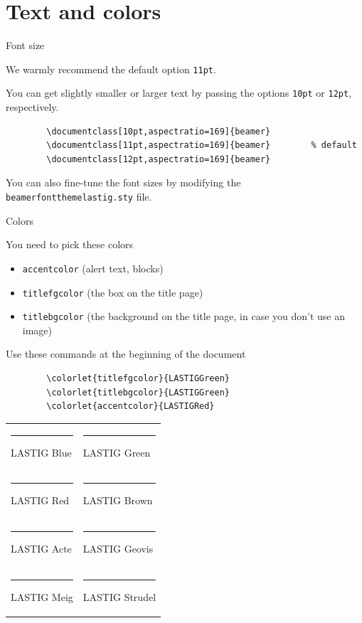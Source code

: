 \documentclass[11pt,aspectratio=169]{beamer}
\begin{document}
\section{Text and colors}
\begin{frame}[fragile]{Font size}

	We warmly recommend the default option \verb+11pt+.
	
	\bigskip
	
	You can get slightly smaller or larger text by passing the options \verb+10pt+ or \verb+12pt+, respectively.
	\begin{verbatim}
		\documentclass[10pt,aspectratio=169]{beamer}
		\documentclass[11pt,aspectratio=169]{beamer}		% default
		\documentclass[12pt,aspectratio=169]{beamer}
	\end{verbatim}	
	
	\bigskip
	You can also fine-tune the font sizes by modifying the \verb+beamerfontthemelastig.sty+ file.

\end{frame}
\begin{frame}[fragile]{Colors}

	You need to pick these colors
	\begin{itemize}
		\item \texttt{accentcolor} (alert text, blocks)
		\item \texttt{titlefgcolor} (the box on the title page)
		\item \texttt{titlebgcolor} (the background on the title page, in case you don't use an image)
	\end{itemize}
	Use these commands at the beginning of the document
	\begin{verbatim}
		\colorlet{titlefgcolor}{LASTIGGreen}
		\colorlet{titlebgcolor}{LASTIGGreen}
		\colorlet{accentcolor}{LASTIGRed}
	\end{verbatim}

	\medskip

	\begin{tabular}{ll}
	\textcolor{LASTIGBlue}{\rule{4mm}{3mm}} LASTIG Blue &
	\textcolor{LASTIGGreen}{\rule{4mm}{3mm}} LASTIG Green \\
    	\textcolor{LASTIGRed}{\rule{4mm}{3mm}} LASTIG Red &
        	\textcolor{LASTIGBrown}{\rule{4mm}{3mm}} LASTIG Brown \\
	\textcolor{LASTIGActe}{\rule{4mm}{3mm}} LASTIG Acte &
	\textcolor{LASTIGGeovis}{\rule{4mm}{3mm}} LASTIG Geovis \\
	\textcolor{LASTIGMeig}{\rule{4mm}{3mm}} LASTIG Meig &
	\textcolor{LASTIGStrudel}{\rule{4mm}{3mm}} LASTIG Strudel \\

	\end{tabular}
	
\end{frame}
\end{document}

